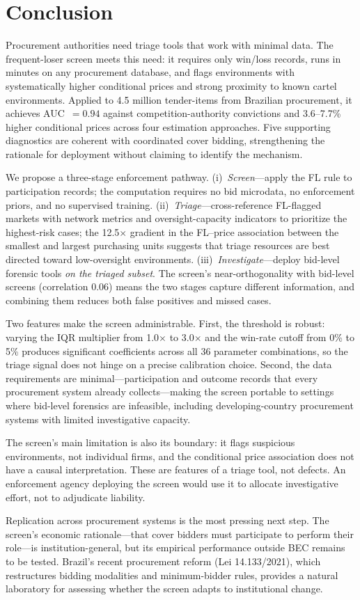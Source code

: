 \section{Conclusion}
\label{sec:conclusion}

Procurement authorities need triage tools that work with minimal data.
The frequent-loser screen meets this need: it requires only win/loss
records, runs in minutes on any procurement database, and flags
environments with systematically higher conditional prices and strong
proximity to known cartel environments. Applied to 4.5 million
tender-items from Brazilian procurement, it achieves AUC~$= 0.94$
against competition-authority convictions and 3.6--7.7\% higher
conditional prices across four estimation approaches. Five supporting
diagnostics are coherent with coordinated cover bidding, strengthening
the rationale for deployment without claiming to identify the
mechanism.

We propose a three-stage enforcement pathway.
(i)~\emph{Screen}---apply the FL rule to participation records; the
computation requires no bid microdata, no enforcement priors, and no
supervised training.
(ii)~\emph{Triage}---cross-reference FL-flagged markets with network
metrics and oversight-capacity indicators to prioritize the
highest-risk cases; the 12.5$\times$ gradient in the FL--price
association between the smallest and largest purchasing units suggests
that triage resources are best directed toward low-oversight
environments.
(iii)~\emph{Investigate}---deploy bid-level forensic tools
\emph{on the triaged subset}. The screen's near-orthogonality with
bid-level screens (correlation 0.06) means the two stages capture
different information, and combining them reduces both false
positives and missed cases.

Two features make the screen administrable. First, the threshold is
robust: varying the IQR multiplier from 1.0$\times$ to 3.0$\times$
and the win-rate cutoff from 0\% to 5\% produces significant
coefficients across all 36 parameter combinations, so the triage
signal does not hinge on a precise calibration choice. Second, the
data requirements are minimal---participation and outcome records
that every procurement system already collects---making the screen
portable to settings where bid-level forensics are infeasible,
including developing-country procurement systems with limited
investigative capacity.

The screen's main limitation is also its boundary: it flags suspicious
environments, not individual firms, and the conditional price
association does not have a causal interpretation. These are features
of a triage tool, not defects. An enforcement agency deploying the
screen would use it to allocate investigative effort, not to
adjudicate liability.

Replication across procurement systems is the most pressing next step.
The screen's economic rationale---that cover bidders must participate
to perform their role---is institution-general, but its empirical
performance outside BEC remains to be tested. Brazil's recent
procurement reform (Lei 14.133/2021), which restructures bidding
modalities and minimum-bidder rules, provides a natural laboratory
for assessing whether the screen adapts to institutional change.
